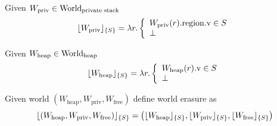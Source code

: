   \begin{definition}
    Given $W_{\mathrm{priv}} \in \mathrm{World}_\text{private stack}$
    \[
\lfloor W_{\mathrm{priv}} \rfloor_{\{S\}} = \lambda r \ldotp \left\{
    \begin{array}{l}
      W_{\mathrm{priv}}(r).\mathrm{region}.\mathrm{v} \in S \\
      \bot
    \end{array}
  \right.
\]
  \end{definition}
  \begin{definition}
    Given $W_{\mathrm{heap}} \in \mathrm{World}_\mathrm{heap}$
    \[
      \lfloor W_{\mathrm{heap}} \rfloor_{\{S\}} = \lambda r \ldotp \left\{
        \begin{array}{l}
          W_{\mathrm{heap}}(r).\mathrm{v} \in S\\
          \bot
        \end{array}
      \right.
    \]
  \end{definition}
  \begin{definition}
    Given world $(W_{\mathrm{heap}},W_{\mathrm{priv}},W_{\mathrm{free}})$ define world erasure as
\[
\lfloor (W_{\mathrm{heap}},W_{\mathrm{priv}},W_{\mathrm{free}}) \rfloor_{\{S\}} =
  \left( \lfloor W_{\mathrm{heap}} \rfloor_{\{S\}},\lfloor W_{\mathrm{priv}} \rfloor_{\{S\}},\lfloor W_{\mathrm{free}} \rfloor_{\{S\}} \right)
\]
  \end{definition}

